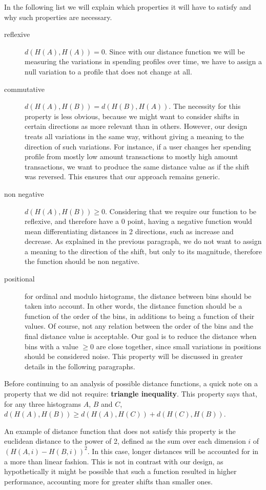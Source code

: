 In the following list we will explain which properties it will have to satisfy and why such properties are necessary.
\begin{description}
  \item[reflexive] $d(H(A), H(A)) = 0$. Since with our distance function we will be measuring the variations in spending profiles over time, we have to assign a null variation to a profile that does not change at all.
  \item[commutative] $d(H(A), H(B)) = d(H(B), H(A))$. The necessity for this property is less obvious, because we might want to consider shifts in certain directions as more relevant than in others. However, our design treats all variations in the same way, without giving a meaning to the direction of such variations. For instance, if a user changes her spending profile from mostly low amount transactions to mostly high amount transactions, we want to produce the same distance value as if the shift was reversed. This ensures that our approach remains generic.
  \item[non negative] $d(H(A), H(B)) \geq 0$. Considering that we require our function to be reflexive, and therefore have a $0$ point, having a negative function would mean differentiating distances in 2 directions, such as increase and decrease. As explained in the previous paragraph, we do not want to assign a meaning to the direction of the shift, but only to its magnitude, therefore the function should be non negative.
  \item[positional] for ordinal and modulo histograms, the distance between bins should be taken into account. In other words, the distance function should be a function of the order of the bins, in additions to being a function of their values. Of course, not any relation between the order of the bins and the final distance value is acceptable. Our goal is to reduce the distance when bins with a value $\geq 0$ are close together, since small variations in positions should be considered noise. This property will be discussed in greater details in the following paragraphs.
\end{description}

Before continuing to an analysis of possible distance functions, a quick note on a property that we did not require: \textbf{triangle inequality}. This property says that, for any three histograms $A$, $B$ and $C$, $d(H(A), H(B)) \geq d(H(A), H(C)) + d(H(C), H(B))$.

An example of distance function that does not satisfy this property is the euclidean distance to the power of 2, defined as the sum over each dimension $i$ of $(H(A,i) - H(B,i))^2$. In this case, longer distances will be accounted for in a more than linear fashion. This is not in contrast with our design, as hypothetically it might be possible that such a function resulted in higher performance, accounting more for greater shifts than smaller ones.

